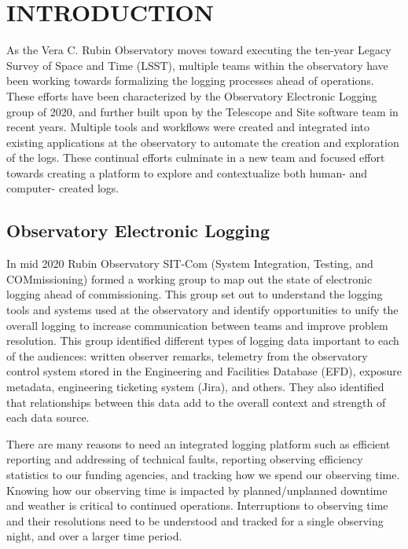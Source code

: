 
\section{INTRODUCTION}
\label{sec:intro}  %

As the Vera C. Rubin Observatory moves toward executing the ten-year Legacy Survey of Space
and Time (LSST)\cite{2019ApJ...873..111I}, multiple teams within the observatory have been working towards
formalizing the logging processes ahead of operations. These efforts have been characterized by the Observatory
Electronic Logging group of 2020, and further built upon by the Telescope and Site
software team in recent years. Multiple tools and workflows were created and integrated
into existing applications at the observatory to automate the creation and exploration of
the logs. These continual efforts culminate in a new team and focused effort towards
creating a platform to explore and contextualize both human- and computer- created logs.


\subsection{Observatory Electronic Logging}

In mid 2020 Rubin Observatory SIT-Com (System Integration, Testing, and COMmissioning)
formed a working group to map out the state of electronic logging ahead of commissioning.
This group set out to understand the logging tools and systems used at the observatory and
identify opportunities to unify the overall logging to increase communication between
teams and improve problem resolution. This group identified different types of logging
data important to each of the audiences: written observer remarks, telemetry from the
observatory control system stored in the Engineering and Facilities Database (EFD),
exposure metadata, engineering ticketing system (Jira), and others. They also identified
that relationships between this data add to the overall context and strength of each data
source.

There are many reasons to need an integrated logging platform such as efficient reporting
and addressing of technical faults, reporting observing efficiency statistics to our
funding agencies, and tracking how we spend our observing time. Knowing how our observing
time is impacted by planned/unplanned downtime and weather is critical to continued
operations. Interruptions to observing time and their resolutions need to be understood
and tracked for a single observing night, and over a larger time period.

